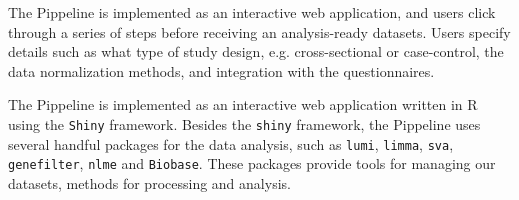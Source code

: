 The Pippeline is implemented as an interactive web application, and users click
through a series of steps before receiving an analysis-ready datasets. 
Users specify details such as what type of study design, e.g. cross-sectional or
case-control, the data normalization methods, and integration with the
questionnaires. 

The Pippeline is implemented as an interactive web application written in R
using the \texttt{Shiny} framework.  Besides the \texttt{shiny} framework, the
Pippeline uses several handful packages for the data analysis, such as
\texttt{lumi}, \texttt{limma}, \texttt{sva}, \texttt{genefilter}, \texttt{nlme}
and \texttt{Biobase}. These packages provide tools for managing our datasets,
methods for processing and analysis. 



